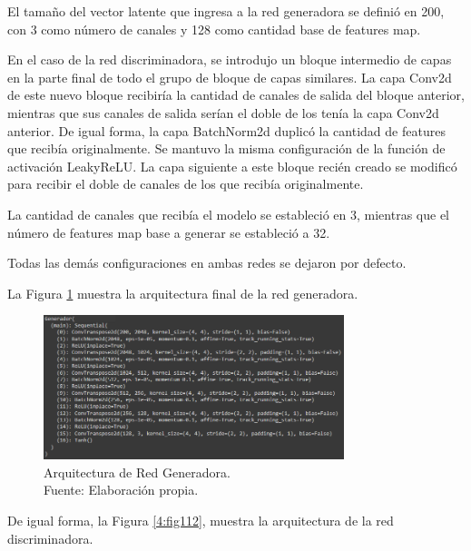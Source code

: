 El tamaño del vector latente que ingresa a la red generadora se definió en 200, con 3 como número de canales y 128 como cantidad base de features map.

En el caso de la red discriminadora, se introdujo un bloque intermedio de capas en la parte final de todo el grupo de bloque de capas similares. La capa Conv2d de este nuevo bloque recibiría la cantidad de canales de salida del bloque anterior, mientras que sus canales de salida serían el doble de los tenía la capa Conv2d anterior. De igual forma, la capa BatchNorm2d  duplicó la cantidad de features que recibía originalmente. Se mantuvo la misma configuración de la función de activación LeakyReLU. La capa siguiente a este bloque recién creado se modificó para recibir el doble de canales de los que recibía originalmente.

La cantidad de canales que recibía el modelo se estableció en 3, mientras que el número de features map base a generar se estableció a 32.

Todas las demás configuraciones en ambas redes se dejaron por defecto.

La Figura \ref{4:fig111} muestra la arquitectura final de la red generadora.

\begin{figure}[H]
	\begin{center}
		\includegraphics[width=0.78\textwidth]{4/figures/generator_network.PNG}
		\caption[Arquitectura de Red Generadora]{Arquitectura de Red Generadora. \\
		Fuente: Elaboración propia.}
		\label{4:fig111}
	\end{center}
\end{figure}

De igual forma, la Figura \ref{4:fig112}, muestra la arquitectura de la red discriminadora. 

